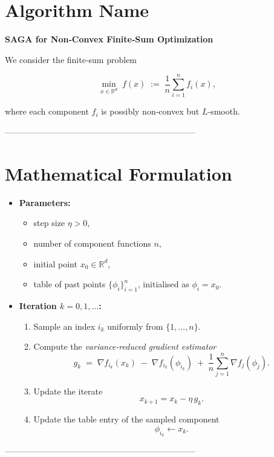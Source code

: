 \documentclass{article}
\newcommand{\R}{\mathbb{R}}
\newcommand{\grad}{\nabla}
\begin{document}
\section*{Algorithm Name}
\textbf{SAGA for Non‑Convex Finite‑Sum Optimization}  

We consider the finite‑sum problem  

\[
\min_{x\in\R^{d}} \; f(x)\;:=\;\frac{1}{n}\sum_{i=1}^{n} f_i(x),
\]

where each component $f_i$ is possibly non‑convex but $L$‑smooth.

--------------------------------------------------------------------

\section*{Mathematical Formulation}

\begin{itemize}
  \item \textbf{Parameters:}
    \begin{itemize}
      \item step size $\eta>0$,
      \item number of component functions $n$,
      \item initial point $x_{0}\in\R^{d}$,
      \item table of past points $\{\phi_i\}_{i=1}^{n}$, initialised as $\phi_i=x_{0}$.
    \end{itemize}
  \item \textbf{Iteration $k=0,1,\dots$:}
    \begin{enumerate}[label=\arabic*.]
      \item Sample an index $i_k$ uniformly from $\{1,\dots ,n\}$.
      \item Compute the \emph{variance‑reduced gradient estimator}
      \[
      g_k \;=\; \grad f_{i_k}(x_k)\;-\;\grad f_{i_k}(\phi_{i_k})\;+\;\frac{1}{n}\sum_{j=1}^{n}\grad f_{j}(\phi_{j}).
      \tag{1}
      \]
      \item Update the iterate
      \[
      x_{k+1}=x_k-\eta\, g_k . \tag{2}
      \]
      \item Update the table entry of the sampled component
      \[
      \phi_{i_k}\leftarrow x_k . \tag{3}
      \]
    \end{enumerate}
\end{itemize}

--------------------------------------------------------------------
\end{document}
